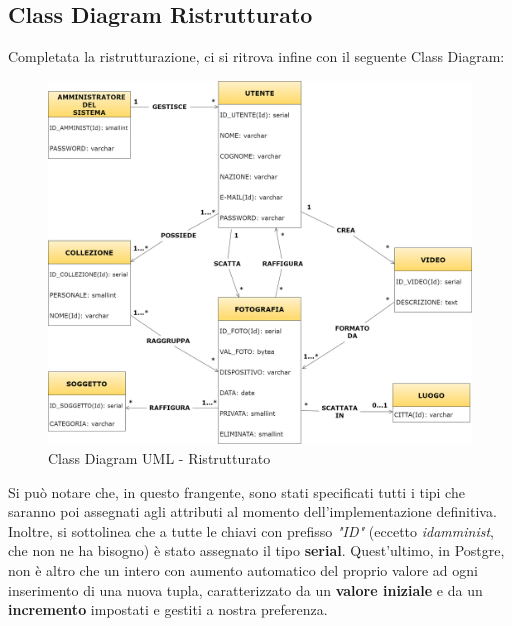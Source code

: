 \documentclass[a4paper]{article}
\begin{document}
        \newpage
        

    \subsection{Class Diagram Ristrutturato}
    \vspace{8pt}
	Completata la ristrutturazione, ci si ritrova infine con
	il seguente Class Diagram:
	
	\begin{figure}[H]
        \begin{center}
            \includegraphics[scale=0.20]{Immagini/Galleria_Fotografica_UML_Ristrutturato}
            \caption{Class Diagram UML - Ristrutturato}
        \end{center}
	\end{figure}

Si può notare che, in questo frangente, sono stati specificati tutti i tipi che saranno poi assegnati agli attributi al momento dell'implementazione definitiva. Inoltre, si sottolinea che a tutte le chiavi con prefisso
\emph{"ID"} (eccetto \emph{id\textunderscore amminist}, che non ne ha bisogno) è
stato assegnato il tipo
\textbf{serial}. Quest'ultimo, in Postgre, non è altro che un intero con aumento automatico del proprio valore ad ogni inserimento di una nuova tupla,  caratterizzato da un \textbf{valore iniziale} e da un \textbf{incremento} impostati e gestiti a nostra preferenza.
\end{document}
